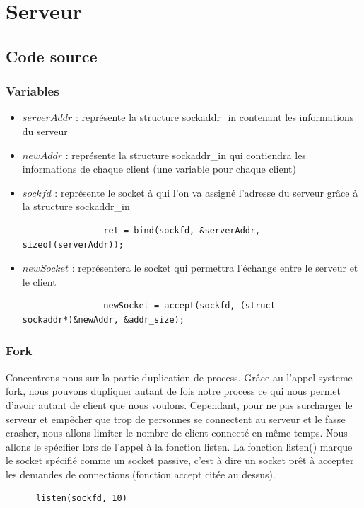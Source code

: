 \documentclass[a4paper,11pt]{report}
\begin{document}
    
\chapter{Serveur}
\textbf{} 
\section{Code source}

\subsection{Variables}
\begin{itemize}
            \item $serverAddr$ : représente la structure sockaddr\_in contenant les informations du serveur
            \item $newAddr$ : représente la structure sockaddr\_in qui contiendra les informations de chaque client (une variable pour chaque client)
            \item $sockfd$ : représente le socket à qui l'on va assigné l'adresse du serveur grâce à la structure sockaddr\_in
            \begin{lstlisting} 
                ret = bind(sockfd, &serverAddr, sizeof(serverAddr));
            \end{lstlisting}
            \item $newSocket$ : représentera le socket qui permettra l'échange entre le serveur et le client
            \begin{lstlisting} 
                newSocket = accept(sockfd, (struct sockaddr*)&newAddr, &addr_size);
            \end{lstlisting}
\end{itemize}
\subsection{Fork}
Concentrons nous sur la partie duplication de process. Grâce au l'appel systeme fork, nous pouvons dupliquer autant de fois notre process ce qui nous permet d'avoir autant de client que nous voulons. Cependant, pour ne pas surcharger le serveur et empêcher que trop de personnes se connectent au serveur et le fasse crasher, nous allons limiter le nombre de client connecté en même temps. Nous allons le spécifier lors de l'appel à la fonction listen. La fonction listen() marque le socket spécifié comme un socket passive, c'est à dire un socket prêt à accepter les demandes de connections (fonction accept citée au dessus).
\begin{lstlisting} 
      listen(sockfd, 10)
\end{lstlisting}
\end{document}
